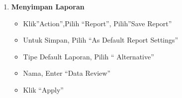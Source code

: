 \documentclass{article}
\begin{document}
\begin{enumerate}
\item \textbf{Menyimpan Laporan}
\begin{itemize}
\item Klik”Action”,Pilih “Report”, Pilih”Save Report”
\item  Untuk Simpan, Pilih “As Default Report Settings”
\item Tipe Default Laporan, Pilih “ Alternative”
\item Nama, Enter “Data Review”
\item Klik “Apply”\\
\end{itemize}
\end{enumerate}
\end{document}

